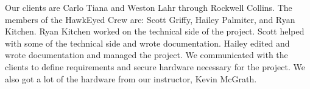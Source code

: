 \par
Our clients are Carlo Tiana and Weston Lahr through Rockwell Collins.
The members of the HawkEyed Crew are: Scott Griffy, Hailey Palmiter, and Ryan Kitchen.
Ryan Kitchen worked on the technical side of the project. Scott helped with some of the technical side and wrote documentation. Hailey edited and wrote documentation and managed the project.
We communicated with the clients to define requirements and secure hardware necessary for the project. We also got a lot of the hardware from our instructor, Kevin McGrath.
